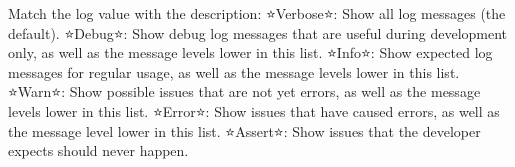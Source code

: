         Match the log value with the description:
            ⭐Verbose⭐: Show all log messages (the default).
            ⭐Debug⭐: Show debug log messages that are useful during development only, as well as the message levels lower in this list.
            ⭐Info⭐: Show expected log messages for regular usage, as well as the message levels lower in this list.
            ⭐Warn⭐: Show possible issues that are not yet errors, as well as the message levels lower in this list.
            ⭐Error⭐: Show issues that have caused errors, as well as the message level lower in this list.
            ⭐Assert⭐: Show issues that the developer expects should never happen.